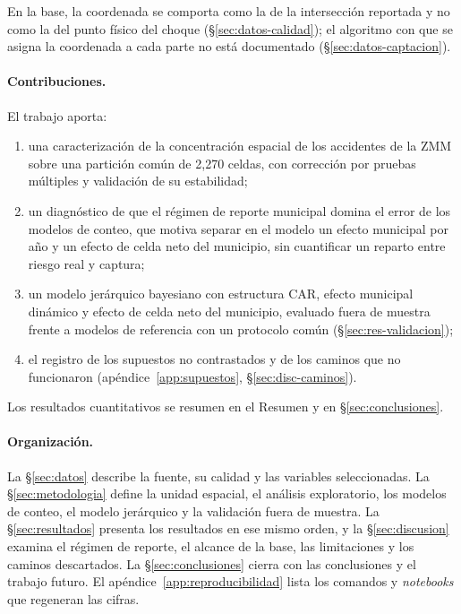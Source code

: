 En la base, la coordenada se comporta como la de la
intersección reportada y no como la del punto físico del choque
(§\ref{sec:datos-calidad}); el algoritmo con que se asigna la coordenada a cada
parte no está documentado (§\ref{sec:datos-captacion}).

\paragraph{Contribuciones.} El trabajo aporta:
\begin{enumerate}
	\item una caracterización de la concentración espacial de los accidentes de la
	      ZMM sobre una partición común de 2,270 celdas, con corrección por
	      pruebas múltiples y validación de su estabilidad;
	\item un diagnóstico de que el régimen de reporte municipal domina el error de
	      los modelos de conteo, que motiva separar en el modelo un efecto
	      municipal por año y un efecto de celda neto del municipio, sin
	      cuantificar un reparto entre riesgo real y captura;
	\item un modelo jerárquico bayesiano con estructura CAR, efecto municipal
	      dinámico y efecto de celda neto del municipio, evaluado fuera de muestra
	      frente a modelos de referencia con un protocolo común
	      (§\ref{sec:res-validacion});
	\item el registro de los supuestos no contrastados y de los caminos que no
	      funcionaron (apéndice~\ref{app:supuestos},
	      §\ref{sec:disc-caminos}).
\end{enumerate}
Los resultados cuantitativos se resumen en el Resumen y en
§\ref{sec:conclusiones}.

\paragraph{Organización.} La §\ref{sec:datos} describe la fuente, su calidad y
las variables seleccionadas. La §\ref{sec:metodologia} define la unidad espacial,
el análisis exploratorio, los modelos de conteo, el modelo jerárquico y la
validación fuera de muestra. La §\ref{sec:resultados} presenta los resultados en
ese mismo orden, y la §\ref{sec:discusion} examina el régimen de reporte, el
alcance de la base, las limitaciones y los caminos descartados. La
§\ref{sec:conclusiones} cierra con las conclusiones y el trabajo futuro. El
apéndice~\ref{app:reproducibilidad} lista los comandos y \emph{notebooks} que
regeneran las cifras.
